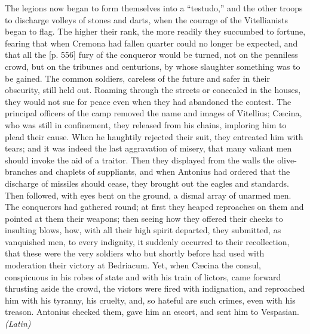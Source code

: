 The legions now began to form themselves into a ``testudo,'' and the other troops to discharge volleys of stones and darts, when the courage of the Vitellianists began to flag. The higher their rank, the more readily they succumbed to fortune, fearing that when Cremona had fallen quarter could no longer be expected, and that all the [p. 556] fury of the conqueror would be turned, not on the penniless crowd, but on the tribunes and centurions, by whose slaughter something was to be gained. The common soldiers, careless of the future and safer in their obscurity, still held out. Roaming through the streets or concealed in the houses, they would not sue for peace even when they had abandoned the contest. The principal officers of the camp removed the name and images of Vitellius; Cæcina, who was still in confinement, they released from his chains, imploring him to plead their cause. When he haughtily rejected their suit, they entreated him with tears; and it was indeed the last aggravation of misery, that many valiant men should invoke the aid of a traitor. Then they displayed from the walls the olive-branches and chaplets of suppliants, and when Antonius had ordered that the discharge of missiles should cease, they brought out the eagles and standards. Then followed, with eyes bent on the ground, a dismal array of unarmed men. The conquerors had gathered round; at first they heaped reproaches on them and pointed at them their weapons; then seeing how they offered their cheeks to insulting blows, how, with all their high spirit departed, they submitted, as vanquished men, to every indignity, it suddenly occurred to their recollection, that these were the very soldiers who but shortly before had used with moderation their victory at Bedriacum. Yet, when Cæcina the consul, conspicuous in his robes of state and with his train of lictors, came forward thrusting aside the crowd, the victors were fired with indignation, and reproached him with his tyranny, his cruelty, and, so hateful are such crimes, even with his treason. Antonius checked them, gave him an escort, and sent him to Vespasian. \emph{(Latin)}


